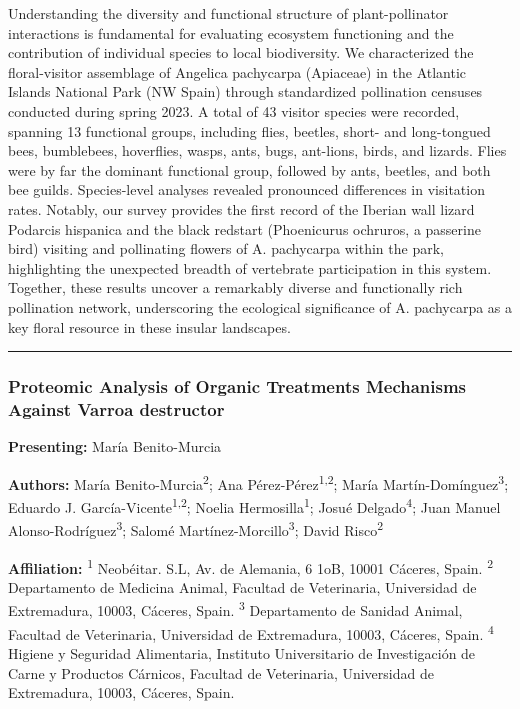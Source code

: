 \documentclass[
  letterpaper,
  DIV=11,
  numbers=noendperiod]{scrartcl}
\begin{document}
Understanding the diversity and functional structure of plant-pollinator
interactions is fundamental for evaluating ecosystem functioning and the
contribution of individual species to local biodiversity. We
characterized the floral-visitor assemblage of Angelica pachycarpa
(Apiaceae) in the Atlantic Islands National Park (NW Spain) through
standardized pollination censuses conducted during spring 2023. A total
of 43 visitor species were recorded, spanning 13 functional groups,
including flies, beetles, short- and long-tongued bees, bumblebees,
hoverflies, wasps, ants, bugs, ant-lions, birds, and lizards. Flies were
by far the dominant functional group, followed by ants, beetles, and
both bee guilds. Species-level analyses revealed pronounced differences
in visitation rates. Notably, our survey provides the first record of
the Iberian wall lizard Podarcis hispanica and the black redstart
(Phoenicurus ochruros, a passerine bird) visiting and pollinating
flowers of A. pachycarpa within the park, highlighting the unexpected
breadth of vertebrate participation in this system. Together, these
results uncover a remarkably diverse and functionally rich pollination
network, underscoring the ecological significance of A. pachycarpa as a
key floral resource in these insular landscapes.

\begin{center}\rule{0.5\linewidth}{0.5pt}\end{center}

\subsubsection{Proteomic Analysis of Organic Treatments Mechanisms
Against Varroa
destructor}\label{proteomic-analysis-of-organic-treatments-mechanisms-against-varroa-destructor}

\textbf{Presenting:} María Benito-Murcia

\textbf{Authors:} María Benito-Murcia\textsuperscript{2}; Ana
Pérez-Pérez\textsuperscript{1,2}; María
Martín-Domínguez\textsuperscript{3}; Eduardo J.
García-Vicente\textsuperscript{1,2}; Noelia
Hermosilla\textsuperscript{1}; Josué Delgado\textsuperscript{4}; Juan
Manuel Alonso-Rodríguez\textsuperscript{3}; Salomé
Martínez-Morcillo\textsuperscript{3}; David Risco\textsuperscript{2}

\textbf{Affiliation:} \textsuperscript{1} Neobéitar. S.L, Av. de
Alemania, 6 1oB, 10001 Cáceres, Spain. \textsuperscript{2} Departamento
de Medicina Animal, Facultad de Veterinaria, Universidad de Extremadura,
10003, Cáceres, Spain. \textsuperscript{3} Departamento de Sanidad
Animal, Facultad de Veterinaria, Universidad de Extremadura, 10003,
Cáceres, Spain. \textsuperscript{4} Higiene y Seguridad Alimentaria,
Instituto Universitario de Investigación de Carne y Productos Cárnicos,
Facultad de Veterinaria, Universidad de Extremadura, 10003, Cáceres,
Spain.
\end{document}
